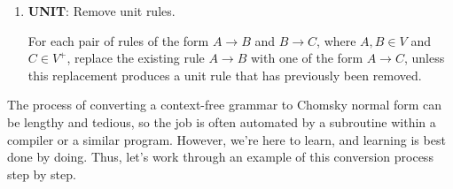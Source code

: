 \begin{colouredbox}
\begin{enumerate}
\item \textbf{UNIT}: Remove unit rules.

For each pair of rules of the form $A \rightarrow B$ and $B \rightarrow C$, where $A, B \in V$ and $C \in V^{+}$, replace the existing rule $A \rightarrow B$ with one of the form $A \rightarrow C$, unless this replacement produces a unit rule that has previously been removed.
\end{enumerate}
\end{colouredbox}

The process of converting a context-free grammar to Chomsky normal form can be lengthy and tedious, so the job is often automated by a subroutine within a compiler or a similar program. However, we're here to learn, and learning is best done by doing. Thus, let's work through an example of this conversion process step by step.

